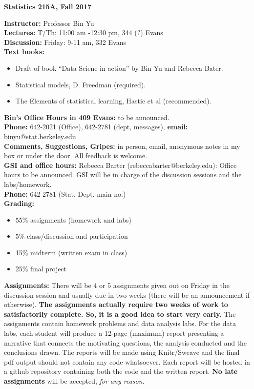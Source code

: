 \documentclass[11pt]{article}
\begin{document}
\begin{center}
{\large \bf Statistics 215A, Fall 2017}
\end{center}
{\bf Instructor:} Professor Bin Yu\\
{\bf Lectures:} T/Th: 11:00 am -12:30 pm,  344 (?) Evans \\
{\bf Discussion:} Friday: 9-11 am,  332 Evans\\

\noindent
{\bf Text books:}
\begin{itemize}
\item Draft of book ``Data Sciene in action'' by Bin Yu and Rebecca Bater.
\item Statistical models, D. Freedman (required).
\item The Elements of statistical learning, Hastie et al (recommended).
\end{itemize}


\noindent
{\bf Bin's Office Hours in 409 Evans:}  to be announced. 
\\[1ex]
{\bf Phone:} 642-2021 (Office), 642-2781 (dept, messages),
{\bf email:} binyu@stat.berkeley.edu \\[1ex]
{\bf Comments, Suggestions, Gripes:} in person, email, 
anonymous notes in my box or under the door.  All feedback is
welcome.\\[2ex]
{\bf GSI and office hours:}  
Rebecca Barter (rebeccabarter@berkeley.edu): Office hours to be announced.
GSI will be in charge of the discussion sessions and the labs/homework.
\\[1ex]
{\bf Phone:} 
642-2781 (Stat. Dept. main no.)
\\[1ex]
{\bf Grading:}
\begin{itemize}
\item 55\% assignments (homework and labs)
\item 5\% class/discussion and participation
\item 15\% midterm (written exam in class)
\item 25\% final project
\end{itemize}
{\bf Assignments:}
There will be 4 or 5 assignments given out on Friday in the discussion session and usually
due in two weeks (there will be an announcement if otherwise). {\bf The assignments
actually require two weeks of work to satisfactorily complete. So, it is a good idea to start very early.} The assignments contain homework problems and data analysis labs. 
For the data labs, each student will produce a 12-page (maximum) report presenting a narrative that connects the motivating questions, the analysis conducted and the conclusions drawn. The reports will be made using Knitr/Sweave and the final pdf output should not contain any code whatsoever. Each report will be hosted in a github repository containing both the code and the written report.  {\bf No late assignments} will be accepted, {\em for any reason.} \\
\end{document}
